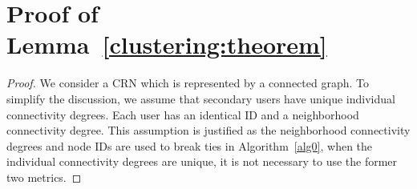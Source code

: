 \documentclass[times]{ettauth}
\theoremstyle{mytheoremstyle}
\theoremstyle{mytheoremstyle}
\theoremstyle{mytheoremstyle}
\begin{document}
\section{Proof of Lemma~\ref{clustering:theorem}}
\begin{proof}
\label{proof_clustering:lemma1}
We consider a CRN which is represented by a connected graph.
To simplify the discussion, we assume that secondary users have unique individual connectivity degrees. 
Each user has an identical ID and a neighborhood connectivity degree.
This assumption is justified as the neighborhood connectivity degrees and node IDs are used to break ties in Algorithm~\ref{alg0}, when the individual connectivity degrees are unique, it is not necessary to use the former two metrics. 


\end{proof}
\end{document}
